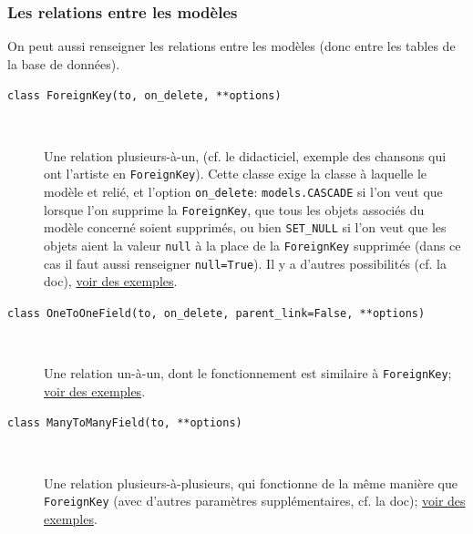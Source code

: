 \documentclass[a4paper, 10pt]{article}
\begin{document}
\subsubsection{Les relations entre les modèles}

On  peut aussi renseigner les relations entre les modèles (donc entre les tables de la base de données).
\begin{description}
    \item[\texttt{class ForeignKey(to, on_delete, **options)}]~

          Une relation plusieurs-à-un, (cf. le didacticiel, exemple des chansons qui ont l'artiste en \texttt{ForeignKey}). Cette classe exige la classe à laquelle le modèle et relié, et l'option \texttt{on\_delete}: \texttt{models.CASCADE} si l'on veut que lorsque l'on supprime la \texttt{ForeignKey}, que tous les objets associés du modèle concerné soient supprimés, ou bien \texttt{SET\_NULL} si l'on veut que les objets aient la valeur \texttt{null} à la place de la \texttt{ForeignKey} supprimée (dans ce cas il faut aussi renseigner \texttt{null=True}). Il y a d'autres possibilités (cf. la doc), \href{https://docs.djangoproject.com/fr/2.0/topics/db/examples/many_to_one/}{voir des exemples}.

    \item[\texttt{class OneToOneField(to, on_delete, parent_link=False, **options)}]~

          Une relation un-à-un, dont le fonctionnement est similaire à \texttt{ForeignKey}; \href{https://docs.djangoproject.com/fr/2.0/topics/db/examples/one_to_one/}{voir des exemples}.

    \item[\texttt{class ManyToManyField(to, **options)}]~

          Une relation plusieurs-à-plusieurs, qui fonctionne de la même manière que \texttt{ForeignKey} (avec d'autres paramètres supplémentaires, cf. la doc); \href{https://docs.djangoproject.com/fr/2.0/topics/db/examples/many_to_many/}{voir des exemples}.
\end{description}
\end{document}
